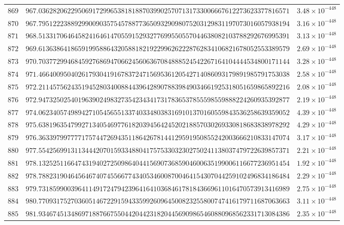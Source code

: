 \documentclass[12pt,reqno]{amsart}
\theoremstyle{remark}
\begin{document}
\begin{longtable}{clc}
$869$ & $967.0362820622950691729965381818870399025707131733006667612273623377816571$ & $3.48\times 10^{-448}$ \\
$870$ & $967.7951222388929900903575457887736509329098075203129831197073016057938194$ & $3.16\times 10^{-448}$ \\
$871$ & $968.5133170646458241646147055915293277699550557044638082103788292676995391$ & $3.13\times 10^{-448}$ \\
$872$ & $969.6136386418659199588643205881821922996262228762834106821678052553389579$ & $2.69\times 10^{-448}$ \\
$873$ & $970.7037729946845927686947066245606367084888524542267164104444534800171144$ & $3.28\times 10^{-448}$ \\
$874$ & $971.4664009504026179304191678372471569536120542714086093179891985791753038$ & $2.58\times 10^{-448}$ \\
$875$ & $972.2114575624351945280340088443964289078839849034661925318051659865892216$ & $2.08\times 10^{-448}$ \\
$876$ & $972.9473250254019639024983273542343417317836537855598559888224260935392877$ & $2.19\times 10^{-448}$ \\
$877$ & $974.0623405749894271054565513374033480383169101370160559843536258639359052$ & $4.39\times 10^{-448}$ \\
$878$ & $975.6381963547992713405469776182039456424520218857030269330818683838978292$ & $4.29\times 10^{-448}$ \\
$879$ & $976.3633979977771757447269435118642678144129591950855242003666210833147074$ & $3.17\times 10^{-448}$ \\
$880$ & $977.5542569913113444207015933488041757533032302750241138037479722639857371$ & $2.21\times 10^{-448}$ \\
$881$ & $978.1325251166474319402725098640441569073685904600635199006116677236951454$ & $1.92\times 10^{-448}$ \\
$882$ & $978.7882319046456467407455667743405346008700464154307044259102496834186484$ & $2.29\times 10^{-448}$ \\
$883$ & $979.7318599003964114917247942396416410368461781843669611016470573913416989$ & $2.75\times 10^{-448}$ \\
$884$ & $980.7709317527036051467229159433599260964500823255800747416179711687063663$ & $3.11\times 10^{-448}$ \\
$885$ & $981.9346745134869718876675504420442318204456909865460880968562331713084386$ & $2.35\times 10^{-448}$ \\

\end{longtable}
\end{document}
